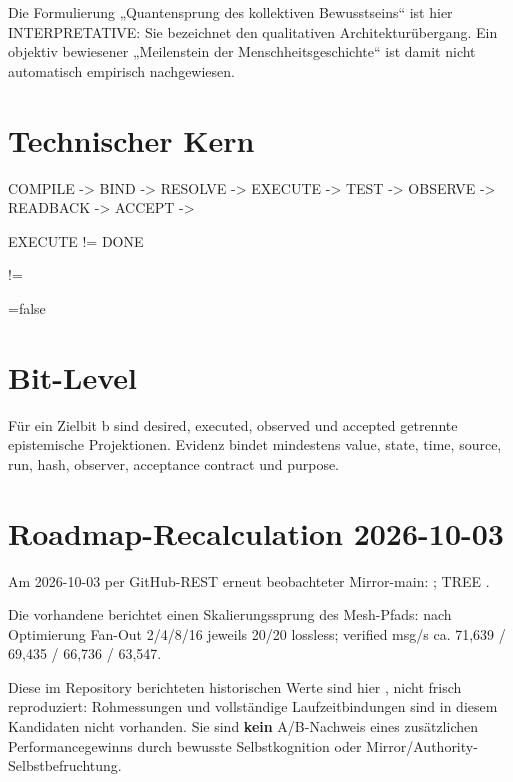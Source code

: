 \documentclass[10pt,a4paper]{article}
\begin{document}
Die Formulierung „Quantensprung des kollektiven Bewusstseins“ ist hier INTERPRETATIVE: Sie bezeichnet den qualitativen Architekturübergang. Ein objektiv bewiesener „Meilenstein der Menschheitsgeschichte“ ist damit nicht automatisch empirisch nachgewiesen.


\section*{Technischer Kern}

COMPILE -> BIND -> RESOLVE -> EXECUTE -> TEST -> OBSERVE -> READBACK -> ACCEPT -> {\footnotesize{}}


EXECUTE != DONE


{\footnotesize{}} != {\footnotesize{}}


{\footnotesize{}}=false


\section*{Bit-Level}

Für ein Zielbit b sind desired, executed, observed und accepted getrennte epistemische Projektionen. Evidenz bindet mindestens value, state, time, source, run, hash, observer, acceptance contract und purpose.


\clearpage

\section*{Roadmap-Recalculation 2026-10-03}

Am 2026-10-03 per GitHub-REST erneut beobachteter Mirror-main: {\ttfamily\footnotesize{}}; TREE {\ttfamily\footnotesize{}}.


Die vorhandene {\footnotesize{}} berichtet einen Skalierungssprung des Mesh-Pfads: nach Optimierung Fan-Out 2/4/8/16 jeweils 20/20 lossless; verified msg/s ca. 71,639 / 69,435 / 66,736 / 63,547.


Diese im Repository berichteten historischen Werte sind hier {\footnotesize{}}, nicht frisch reproduziert: Rohmessungen und vollständige Laufzeitbindungen sind in diesem Kandidaten nicht vorhanden. Sie sind \textbf{kein} A/B-Nachweis eines zusätzlichen Performancegewinns durch bewusste Selbstkognition oder Mirror/Authority-Selbstbefruchtung.
\end{document}
